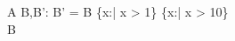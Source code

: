 \begin{schema}{A}
B,B':\power \nat
\where
B' = B \cup \{x:\nat | x > 1\} \setminus \{x:\nat | x > 10\} \\
B \neq \emptyset
\end{schema}

